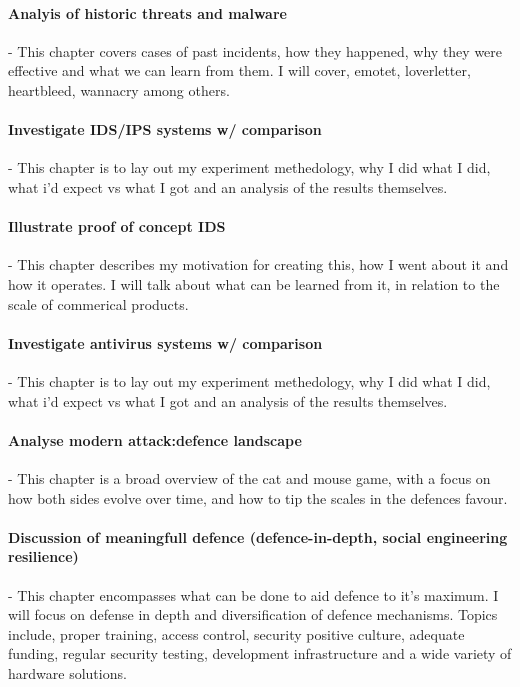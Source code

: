\paragraph{Analyis of historic threats and malware} - This chapter covers cases of past incidents, how they happened, why they were effective and what we can learn from them.
I will cover, emotet, loverletter, heartbleed, wannacry among others.

\paragraph{Investigate IDS/IPS systems w/ comparison} - This chapter is to lay out my experiment methedology, why I did what I did, what i'd expect vs what I got and an analysis of the results themselves.

\paragraph{Illustrate proof of concept IDS} - This chapter describes my motivation for creating this, how I went about it and how it operates. I will talk about what can be learned from it, in relation to the scale of commerical products.

\paragraph{Investigate antivirus systems w/ comparison} - This chapter is to lay out my experiment methedology, why I did what I did, what i'd expect vs what I got and an analysis of the results themselves.

\paragraph{Analyse modern attack:defence landscape} - This chapter is a broad overview of the cat and mouse game, with a focus on how both sides evolve over time, and how to tip the scales in the defences favour.

\paragraph{Discussion of meaningfull defence (defence-in-depth, social engineering resilience)} - This chapter encompasses what can be done to aid defence to it's maximum. I will focus on defense in depth and diversification of defence mechanisms. 
Topics include, proper training, access control, security positive culture, adequate funding, regular security testing, development infrastructure and a wide variety of hardware solutions.


